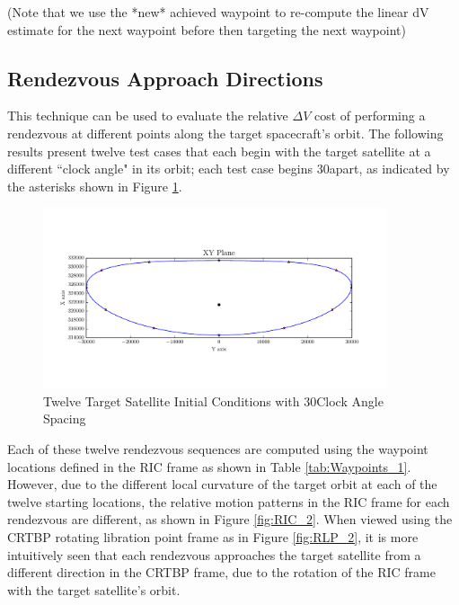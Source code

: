 \documentclass[a4paper]{article}
\begin{document}
(Note that we use the *new* achieved waypoint to re-compute the linear dV estimate for the next waypoint before then targeting the next waypoint)

\subsection{Rendezvous Approach Directions}

This technique can be used to evaluate the relative \(\Delta V\) cost of performing a rendezvous at different points along the target spacecraft's orbit.  The following results present twelve test cases that each begin with the target satellite at a different ``clock angle" in its orbit; each test case begins 30\textdegree apart, as indicated by the asterisks shown in Figure \ref{fig:FullOrbit_2}.

\begin{figure}[h] \label{fig:FullOrbit_2}
	\begin{center}
		\includegraphics[width=0.9\textwidth]{Target_Full_Orbit_2}
		\caption{Twelve Target Satellite Initial Conditions with 30\textdegree Clock Angle Spacing}
	\end{center}
\end{figure}

Each of these twelve rendezvous sequences are computed using the waypoint locations defined in the RIC frame as shown in Table \ref{tab:Waypoints_1}.  However, due to the different local curvature of the target orbit at each of the twelve starting locations, the relative motion patterns in the RIC frame for each rendezvous are different, as shown in Figure \ref{fig:RIC_2}.  When viewed using the CRTBP rotating libration point frame as in Figure \ref{fig:RLP_2}, it is more intuitively seen that each rendezvous approaches the target satellite from a different direction in the CRTBP frame, due to the rotation of the RIC frame with the target satellite's orbit.
\end{document}
